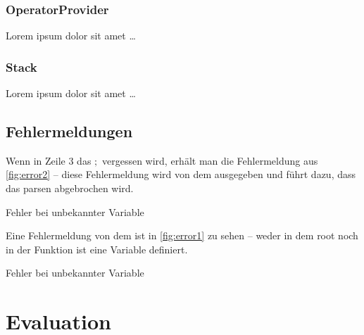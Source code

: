 {    %
    \subsubsection{OperatorProvider}
    \label{sssec:OperatorProvider}
      Lorem ipsum dolor sit amet \ldots

    \subsubsection{Stack}
    \label{sssec:Stack}
      Lorem ipsum dolor sit amet \ldots


  \subsection{Fehlermeldungen}
  \label{ssec:Fehlermeldungen}
    Wenn in Zeile 3 das \myRIn$;$ vergessen wird, erhält man die Fehlermeldung aus \autoref{fig:error2} -- diese Fehlermeldung wird von dem  ausgegeben und führt dazu, dass das parsen abgebrochen wird.

    \begin{myCodeEnv}
      \centering
      \begin{myInvBox}[width=.9\linewidth]
        
      \end{myInvBox}
      \caption{Fehler bei unbekannter Variable}
      \label{fig:error2}
    \end{myCodeEnv}

    Eine Fehlermeldung von dem  ist in \autoref{fig:error1} zu sehen -- weder in dem root  noch in der  Funktion ist eine Variable  definiert.
    \begin{myCodeEnv}
      \centering
      \begin{myInvBox}[width=.9\linewidth]
        
      \end{myInvBox}
      \caption{Fehler bei unbekannter Variable}
      \label{fig:error1}
    \end{myCodeEnv}

\section{Evaluation}
\label{sec:Evaluation}

}
